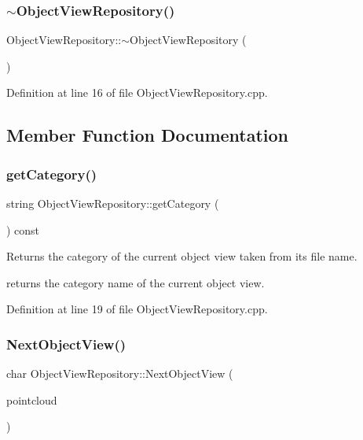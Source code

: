 \subsubsection{\texorpdfstring{$\sim$\+Object\+View\+Repository()}{~ObjectViewRepository()}}
{\footnotesize\ttfamily Object\+View\+Repository\+::$\sim$\+Object\+View\+Repository (\begin{DoxyParamCaption}{ }\end{DoxyParamCaption})}



Definition at line 16 of file Object\+View\+Repository.\+cpp.



\subsection{Member Function Documentation}
\mbox{\label{class_object_view_repository_a36db267a37e49a138719124066411bc1}} 
\subsubsection{\texorpdfstring{get\+Category()}{getCategory()}}
{\footnotesize\ttfamily string Object\+View\+Repository\+::get\+Category (\begin{DoxyParamCaption}{ }\end{DoxyParamCaption}) const}

Returns the category of the current object view taken from its file name.

returns the category name of the current object view. 

Definition at line 19 of file Object\+View\+Repository.\+cpp.

\mbox{\label{class_object_view_repository_adc9db1af3b3d61f0fe45a6a4173abd0d}} 
\subsubsection{\texorpdfstring{Next\+Object\+View()}{NextObjectView()}}
{\footnotesize\ttfamily char Object\+View\+Repository\+::\+Next\+Object\+View (\begin{DoxyParamCaption}\item[{Point\+Cloud$<$ \hyperlink{include_8h_a6ca7710b84e9152e036423253ffc1ae7}{PointT} $>$\+::Ptr \&}]{pointcloud }\end{DoxyParamCaption})}

